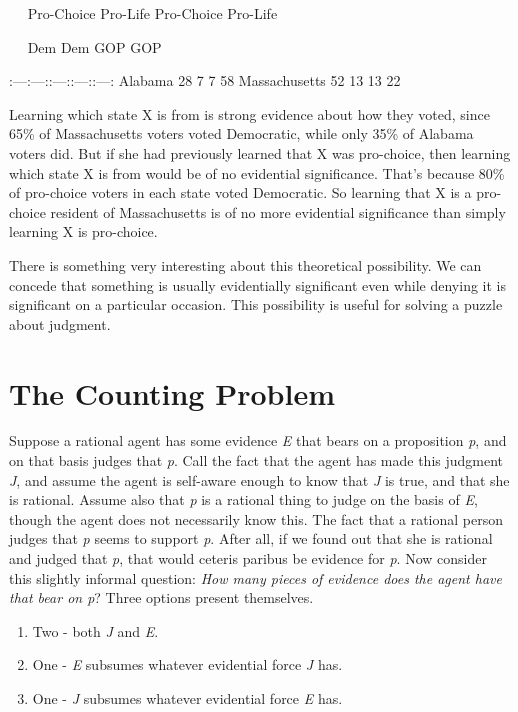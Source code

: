 \documentclass[
  10pt,
  letterpaper,
  twoside]{scrbook}
\providecommand{\tightlist}{%
  \setlength{\itemsep}{0pt}\setlength{\parskip}{0pt}}\usepackage{longtable,booktabs,array}
\begin{document}
~~\textbar{} Pro-Choice \textbar{} Pro-Life \textbar{} Pro-Choice
\textbar{} Pro-Life \textbar{}\\
\strut ~~\textbar{} Dem \textbar{} Dem \textbar{} GOP \textbar{} GOP
\textbar{}

\textbar:---\textbar:---:\textbar:---:\textbar:---:\textbar:---:\textbar{}
\textbar{} Alabama \textbar{} 28 \textbar{} 7 \textbar{} 7 \textbar{} 58
\textbar{} \textbar{} Massachusetts \textbar{} 52 \textbar{} 13
\textbar{} 13 \textbar{} 22 \textbar{}

Learning which state X is from is strong evidence about how they voted,
since 65\% of Massachusetts voters voted Democratic, while only 35\% of
Alabama voters did. But if she had previously learned that X was
pro-choice, then learning which state X is from would be of no
evidential significance. That's because 80\% of pro-choice voters in
each state voted Democratic. So learning that X is a pro-choice resident
of Massachusetts is of no more evidential significance than simply
learning X is pro-choice.

There is something very interesting about this theoretical possibility.
We can concede that something is usually evidentially significant even
while denying it is significant on a particular occasion. This
possibility is useful for solving a puzzle about judgment.

\section{The Counting Problem}\label{thecountingproblem}

Suppose a rational agent has some evidence \emph{E} that bears on a
proposition \emph{p}, and on that basis judges that \emph{p}. Call the
fact that the agent has made this judgment \emph{J}, and assume the
agent is self-aware enough to know that \emph{J} is true, and that she
is rational. Assume also that \emph{p} is a rational thing to judge on
the basis of \emph{E}, though the agent does not necessarily know this.
The fact that a rational person judges that \emph{p} seems to support
\emph{p}. After all, if we found out that she is rational and judged
that \emph{p}, that would ceteris paribus be evidence for \emph{p}. Now
consider this slightly informal question: \emph{How many pieces of
evidence does the agent have that bear on p}? Three options present
themselves.

\begin{enumerate}
\def\labelenumi{\arabic{enumi}.}
\tightlist
\item
  Two - both \emph{J} and \emph{E}.
\item
  One - \emph{E} subsumes whatever evidential force \emph{J} has.
\item
  One - \emph{J} subsumes whatever evidential force \emph{E} has.
\end{enumerate}
\end{document}
